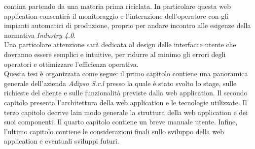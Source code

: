     contina partendo da una materia prima riciclata. In particolare questa web application consentirà il
    monitoraggio e l'interazione dell'operatore con gli impianti automatici di produzione, proprio per
    andare incontro alle esigenze della normativa \textit{Industry 4.0}.\\
    Una particolare attenzione sarà dedicata al design delle interfacce utente che dovranno
    essere semplici e intuitive, per ridurre al minimo gli errori degli operatori e
    ottimizzare l’efficienza operativa.\\
    Questa tesi è organizzata come segue: il primo capitolo contiene una panoramica generale dell'azienda
    \textit{Adipso S.r.l} presso la quale è stato svolto lo stage, sulle richieste del cliente e sulle
    funzionalità previste dalla web application. Il secondo capitolo presenta l'architettura della web
    application e le tecnologie utilizzate. Il terzo capitolo decrive lain modo generale la
    struttura della web application e dei suoi componenti. Il quarto capitolo contiene un breve manuale
    utente. Infine, l'ultimo capitolo contiene le considerazioni finali sullo sviluppo della web application
    e eventuali sviluppi futuri.